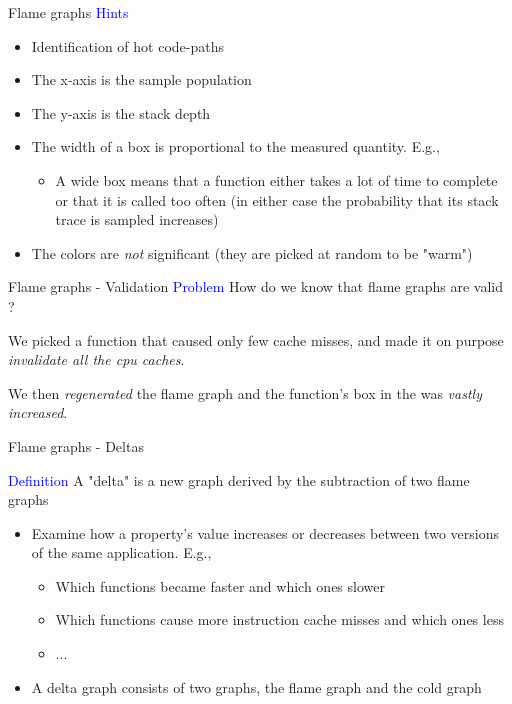 \documentclass{beamer}
\begin{document}
\begin{frame}{Flame graphs}
\textcolor{blue}{Hints}

\begin{itemize}
	\item Identification of hot code-paths
	\item The x-axis is the sample population
	\item The y-axis is the stack depth
	\item The width of a box is proportional to the measured quantity. E.g.,
	\begin{itemize}
		\item A wide box means that a function either takes a lot of time to complete or
		that it is called too often (in either case the probability that its stack trace
		is sampled increases)
	\end{itemize}
	\item The colors are \textit{not} significant (they are picked at random to be "warm")
\end{itemize}
\end{frame}

\begin{frame}{Flame graphs - Validation}
\textcolor{blue}{Problem} How do we know that flame graphs are valid ?

\vspace{5mm}

We picked a function that caused only few cache misses, and made it on purpose
\textit{invalidate all the cpu caches}.

\vspace{5mm}

We then \textit{regenerated} the flame graph and the function's box in the was
\textit{vastly increased}.
\end{frame}

\begin{frame}{Flame graphs - Deltas}

\textcolor{blue}{Definition} A "delta" is a new graph derived
by the subtraction of two flame graphs
\begin{itemize}
\item Examine how a property's value increases or decreases between two versions
of the same application. E.g.,
\begin{itemize}
\item Which functions became faster and which ones slower
\item Which functions cause more instruction cache misses and which ones less
\item ...
\end{itemize}
\item A delta graph consists of two graphs, the flame graph and the cold graph
\end{itemize}

\end{frame}
\end{document}
